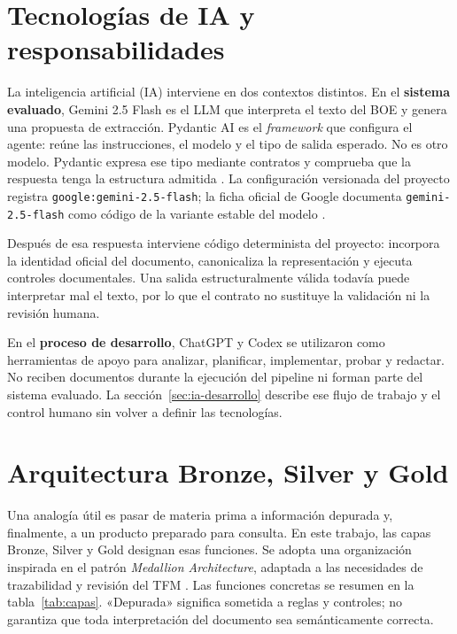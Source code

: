 \section{Tecnologías de IA y responsabilidades}
\label{sec:tecnologias-ia}
La inteligencia artificial (IA) interviene en dos contextos distintos. En el
\textbf{sistema evaluado}, Gemini 2.5 Flash es el LLM que interpreta el texto
del BOE y genera una propuesta de extracción. Pydantic AI es el
\emph{framework} que configura el agente: reúne las instrucciones, el modelo y
el tipo de salida esperado. No es otro modelo. Pydantic expresa ese tipo
mediante contratos y comprueba que la respuesta tenga la estructura admitida
\cite{pydantic_ai_overview_2026}.
La configuración versionada del proyecto registra
\texttt{google:gemini-2.5-flash}; la ficha oficial de Google documenta
\texttt{gemini-2.5-flash} como código de la variante estable del modelo
\cite{google_gemini25flash_2026}.

Después de esa respuesta interviene código determinista del proyecto: incorpora
la identidad oficial del documento, canonicaliza la representación y ejecuta
controles documentales. Una salida estructuralmente válida todavía puede
interpretar mal el texto, por lo que el contrato no sustituye la validación ni
la revisión humana.

En el \textbf{proceso de desarrollo}, ChatGPT y Codex se utilizaron como
herramientas de apoyo para analizar, planificar, implementar, probar y redactar.
No reciben documentos durante la ejecución del pipeline ni forman parte del
sistema evaluado. La sección~\ref{sec:ia-desarrollo} describe ese flujo de
trabajo y el control humano sin volver a definir las tecnologías.

\section{Arquitectura Bronze, Silver y Gold}
\label{sec:capas}

Una analogía útil es pasar de materia prima a información depurada y,
finalmente, a un producto preparado para consulta. En este trabajo, las capas
Bronze, Silver y Gold designan esas funciones. Se adopta una organización
inspirada en el patrón \emph{Medallion Architecture}, adaptada a las
necesidades de trazabilidad y revisión del TFM
\cite{databricks_medallion_2026}.
Las funciones concretas se resumen en la tabla~\ref{tab:capas}. «Depurada»
significa sometida a reglas y controles;
no garantiza que toda interpretación del documento sea semánticamente correcta.

